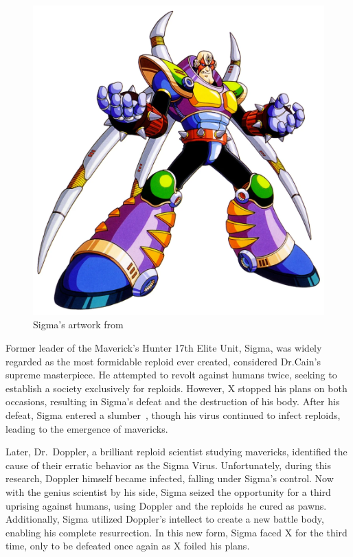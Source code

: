 \begin{figure}[htp]
	\centering
	\includegraphics[height=\portraitsize]{figures/X3/Doppler_stages/Sigma.png}
	\caption{Sigma's artwork from~\cite{book:MMX_Complete_art}}
\end{figure}
Former leader of the Maverick's Hunter 17th Elite Unit, Sigma, was widely regarded as the most formidable reploid ever created, considered Dr.Cain's supreme masterpiece. He attempted to revolt against humans twice, seeking to establish a society exclusively for reploids. However, X stopped his plans on both occasions, resulting in Sigma's defeat and the destruction of his body. After his defeat, Sigma entered a slumber~\cite{wayback:X3_resources}, though his virus continued to infect reploids, leading to the emergence of mavericks.

Later, Dr.~Doppler, a brilliant reploid scientist studying mavericks, identified the cause of their erratic behavior as the Sigma Virus. Unfortunately, during this research, Doppler himself became infected, falling under Sigma's control. Now with the genius scientist by his side, Sigma seized the opportunity for a third uprising against humans, using Doppler and the reploids he cured as pawns. Additionally, Sigma utilized Doppler's intellect to create a new battle body, enabling his complete resurrection. In this new form, Sigma faced X for the third time, only to be defeated once again as X foiled his plans.


